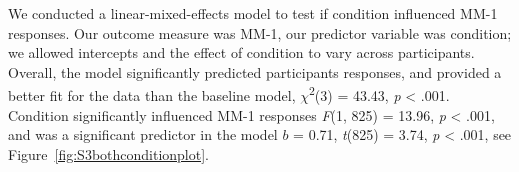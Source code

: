\documentclass[
  man,floatsintext]{apa7}
\begin{document}
We conducted a linear-mixed-effects model to test if condition influenced MM-1 responses. Our outcome measure was MM-1, our predictor variable was condition; we allowed intercepts and the effect of condition to vary across participants. Overall, the model significantly predicted participants responses, and provided a better fit for the data than the baseline model, \(\chi\)\textsuperscript{2}(3) = 43.43, \emph{p} \textless{} .001. Condition significantly influenced MM-1 responses \emph{F}(1, 825) = 13.96, \emph{p} \textless{} .001, and was a significant predictor in the model \(b\) = 0.71, \emph{t}(825) = 3.74, \emph{p} \textless{} .001, see Figure~\ref{fig:S3bothconditionplot}.
\end{document}

